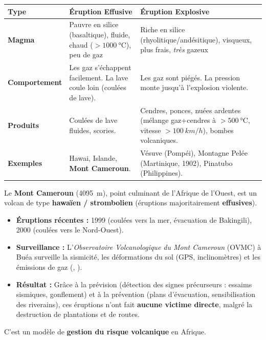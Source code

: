 \documentclass[11pt]{article}
\newcommand{\cle}[1]{{\popxbold\color{popdark}#1}}
\begin{document}
\begin{propriete}
\begin{center}
\begin{tabularx}{\linewidth}{|l|X|X|}\hline
\textbf{Type} & \textbf{Éruption \cle{Effusive}} & \textbf{Éruption \cle{Explosive}} \\ \hline
\textbf{Magma} & Pauvre en silice (basaltique), fluide, chaud ($>\SI{1000}{\degreeCelsius}$), peu de gaz & Riche en silice (rhyolitique/andésitique), visqueux, plus frais, \emph{très} gazeux \\ \hline
\textbf{Comportement} & Les gaz s'échappent facilement. La lave coule loin (coulées de lave). & Les gaz sont piégés. La pression monte jusqu'à l'explosion violente. \\ \hline
\textbf{Produits} & Coulées de lave fluides, scories. & Cendres, ponces, \cle{nuées ardentes} (mélange gaz+cendres à $>\SI{500}{\degreeCelsius}$, vitesse $>\SI{100}{km/h}$), bombes volcaniques. \\ \hline
\textbf{Exemples} & Hawai, Islande, \textbf{Mont Cameroun}. & Vésuve (Pompéi), Montagne Pelée (Martinique, 1902), Pinatubo (Philippines). \\ \hline
\end{tabularx}
\end{center}
\end{propriete}

\begin{savaistu}
Le \textbf{Mont Cameroun} (\SI{4095}{m}), point culminant de l'Afrique de l'Ouest, est un volcan de type \textbf{hawaïen / strombolien} (éruptions majoritairement \textbf{effusives}). 
\begin{itemize}
    \item \textbf{Éruptions récentes :} 1999 (coulées vers la mer, évacuation de Bakingili), 2000 (coulées vers le Nord-Ouest).
    \item \textbf{Surveillance :} L'\emph{Observatoire Volcanologique du Mont Cameroun} (OVMC) à Buéa surveille la sismicité, les déformations du sol (GPS, inclinomètres) et les émissions de gaz (, ).
    \item \textbf{Résultat :} Grâce à la \cle{prévision} (détection des signes précurseurs : essaims sismiques, gonflement) et à la \cle{prévention} (plans d'évacuation, sensibilisation des riverains), ces éruptions n'ont fait \textbf{aucune victime directe}, malgré la destruction de plantations et de routes.
\end{itemize}
C'est un modèle de \textbf{gestion du risque volcanique} en Afrique.
\end{savaistu}
\end{document}
